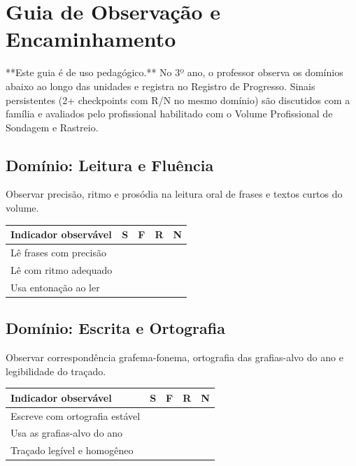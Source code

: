 
\chapter{Guia de Observação e Encaminhamento}

**Este guia é de uso pedagógico.** No 3º ano, o professor observa os domínios abaixo ao longo das unidades e registra no Registro de Progresso. Sinais persistentes (2+ checkpoints com R/N no mesmo domínio) são discutidos com a família e avaliados pelo profissional habilitado com o Volume Profissional de Sondagem e Rastreio.

\section{Domínio: Leitura e Fluência}
Observar precisão, ritmo e prosódia na leitura oral de frases e textos curtos do volume.

\begin{center}
\renewcommand{\arraystretch}{1.4}
\begin{tabular}{@{}p{9cm}cccc@{}}
\toprule
Indicador observável & S & F & R & N \\
\midrule

Lê frases com precisão & & & & \\

Lê com ritmo adequado & & & & \\

Usa entonação ao ler & & & & \\

\bottomrule\end{tabular}\end{center}

\section{Domínio: Escrita e Ortografia}
Observar correspondência grafema-fonema, ortografia das grafias-alvo do ano e legibilidade do traçado.

\begin{center}
\renewcommand{\arraystretch}{1.4}
\begin{tabular}{@{}p{9cm}cccc@{}}
\toprule
Indicador observável & S & F & R & N \\
\midrule

Escreve com ortografia estável & & & & \\

Usa as grafias-alvo do ano & & & & \\

Traçado legível e homogêneo & & & & \\

\bottomrule\end{tabular}\end{center}

